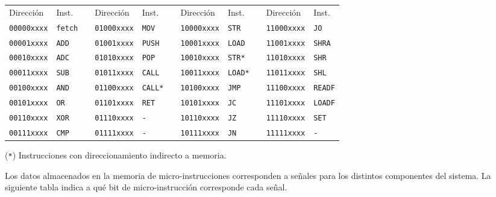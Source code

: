 \documentclass[a4paper,11pt]{article}
\begin{document}
\small
\begin{center}
\begin{tabular}[t]{l|lcl|lcl|lcl|l}
Dirección          & Inst.         & & Dirección          & Inst.         & & Dirección          & Inst.         & & Dirección          & Inst.         \\  
\cline{1-2} \cline{4-5} \cline{7-8} \cline{10-11}
\texttt{00000xxxx} & \texttt{fetch}& & \texttt{01000xxxx} & \texttt{MOV}  & & \texttt{10000xxxx} & \texttt{STR}  & & \texttt{11000xxxx} & \texttt{JO}   \\
\texttt{00001xxxx} & \texttt{ADD}  & & \texttt{01001xxxx} & \texttt{PUSH} & & \texttt{10001xxxx} & \texttt{LOAD} & & \texttt{11001xxxx} & \texttt{SHRA} \\
\texttt{00010xxxx} & \texttt{ADC}  & & \texttt{01010xxxx} & \texttt{POP}  & & \texttt{10010xxxx} & \texttt{STR*} & & \texttt{11010xxxx} & \texttt{SHR}  \\
\texttt{00011xxxx} & \texttt{SUB}  & & \texttt{01011xxxx} & \texttt{CALL} & & \texttt{10011xxxx} & \texttt{LOAD*}& & \texttt{11011xxxx} & \texttt{SHL}  \\
\texttt{00100xxxx} & \texttt{AND}  & & \texttt{01100xxxx} & \texttt{CALL*}& & \texttt{10100xxxx} & \texttt{JMP}  & & \texttt{11100xxxx} & \texttt{READF}\\
\texttt{00101xxxx} & \texttt{OR}   & & \texttt{01101xxxx} & \texttt{RET}  & & \texttt{10101xxxx} & \texttt{JC}   & & \texttt{11101xxxx} & \texttt{LOADF}\\
\texttt{00110xxxx} & \texttt{XOR}  & & \texttt{01110xxxx} & \texttt{-}    & & \texttt{10110xxxx} & \texttt{JZ}   & & \texttt{11110xxxx} & \texttt{SET}  \\
\texttt{00111xxxx} & \texttt{CMP}  & & \texttt{01111xxxx} & \texttt{-}    & & \texttt{10111xxxx} & \texttt{JN}   & & \texttt{11111xxxx} & \texttt{-}    \\
\end{tabular}
\end{center}
(\texttt{*}) Instrucciones con direccionamiento indirecto a memoria.
\normalsize

\bigskip

Los datos almacenados en la memoria de micro-instrucciones corresponden a señales para los distintos componentes del sistema.
La siguiente tabla indica a qué bit de micro-instrucción corresponde cada señal.
\end{document}
